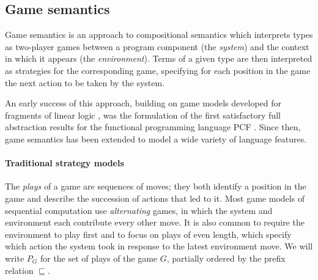 \documentclass[sigplan,screen]{acmart}
\begin{document}


\subsection{Game semantics} \label{sec:strat} %

Game semantics is an approach to compositional semantics
which interprets types as two-player games
between a program component (the \emph{system})
and the context in which it appears (the \emph{environment}).
Terms of a given type are then interpreted as
strategies for the corresponding game,
specifying for each position in the game
the next action to be taken by the system.

An early success of this approach,
building on game models developed for
fragments of linear logic \cite{gsll,gsllaj},
was the formulation of the first satisfactory
full abstraction results
for the functional programming language PCF \cite{pcfajm,pcfho}.
Since then,
game semantics has been extended to
model a wide variety of language features.

\paragraph{Traditional strategy models} %

The \emph{plays} of a game are sequences of moves;
they both identify a position in the game
and describe the succession of actions that led to it.
Most game models of sequential computation
use \emph{alternating} games,
in which
the system and environment each contribute
every other move.
It is also common to require the environment to play first
and to focus on plays of even length,
which specify which action the system took
in response to the latest environment move.
We will write $P_G$ for the set of plays of the game $G$,
partially ordered by the prefix relation $\sqsubseteq$.
\end{document}
